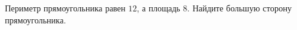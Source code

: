 \begin{ex}
	\begin{condition}
		Периметр прямоугольника равен \( 12 \), а площадь \( 8 \). Найдите большую сторону прямоугольника.
	\end{condition}
\end{ex}